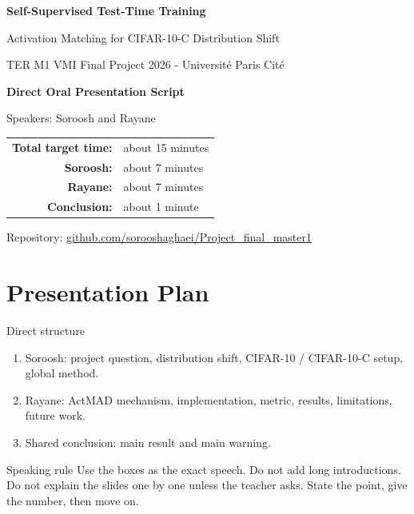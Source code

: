 \documentclass[11pt,a4paper]{article}
\begin{document}
\begin{titlepage}
\centering
\vspace*{2.0cm}
{\Huge\bfseries Self-Supervised Test-Time Training\par}
\vspace{0.35cm}
{\Large Activation Matching for CIFAR-10-C Distribution Shift\par}
\vspace{1.1cm}
{\large TER M1 VMI Final Project 2026 - Universit\'e Paris Cit\'e\par}
\vspace{1.1cm}
{\Large\bfseries Direct Oral Presentation Script\par}
\vspace{0.4cm}
{\large Speakers: Soroosh and Rayane\par}
\vspace{0.8cm}
\begin{tabular}{rl}
\textbf{Total target time:} & about 15 minutes \\
\textbf{Soroosh:} & about 7 minutes \\
\textbf{Rayane:} & about 7 minutes \\
\textbf{Conclusion:} & about 1 minute \\
\end{tabular}
\vfill
{\small Repository: \href{https://github.com/sorooshaghaei/Project_final_master1}{github.com/sorooshaghaei/Project\_final\_master1}\par}
\end{titlepage}
\clearpage
{}

\section{Presentation Plan}

\begin{notebox}{Direct structure}
\begin{enumerate}
    \item Soroosh: project question, distribution shift, CIFAR-10 / CIFAR-10-C setup, global method.
    \item Rayane: ActMAD mechanism, implementation, metric, results, limitations, future work.
    \item Shared conclusion: main result and main warning.
\end{enumerate}
\end{notebox}

\begin{notebox}{Speaking rule}
Use the boxes as the exact speech. Do not add long introductions. Do not explain the slides one by one unless the teacher asks. State the point, give the number, then move on.
\end{notebox}
\end{document}
